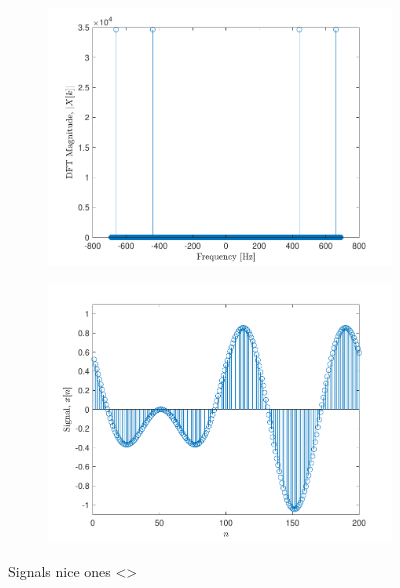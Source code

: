 \documentclass[10pt]{article}
\begin{document}
\begin{figure}[ht]
    \centering
    \begin{subfigure}[b]{0.48\textwidth}
        \includegraphics[width=\textwidth]{problem1_fft.pdf}
    \end{subfigure}
    \quad
    \begin{subfigure}[b]{0.48\textwidth}
        \includegraphics[width=\textwidth]{problem1_sig.pdf}
    \end{subfigure}
    \caption{Signals nice ones <>\vspace{-0.5cm}}
    \label{freq_domain_design_for_time_domain_signal}
\end{figure}
\end{document}
